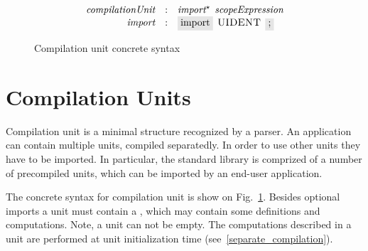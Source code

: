 \begin{figure}[t]
  \[
    \begin{array}{rcl}
      \defterm{compilationUnit}  & : & \nonterm{import}^\star\s\nonterm{scopeExpression}\\
      \defterm{import}           & : & \term{import}\s\token{UIDENT}\s\term{;}
    \end{array}
  \]
  \caption{Compilation unit concrete syntax}
  \label{compilation_unit}
\end{figure}

\section{Compilation Units}

Compilation unit is a minimal structure recognized by a parser. An application can contain multiple units, compiled separatedly.
In order to use other units they have to be imported. In particular, the standard library is comprized of a number of precompiled units,
which can be imported by an end-user application.

The concrete syntax for compilation unit is show on Fig.~\ref{compilation_unit}. Besides optional imports a unit must contain
a , which may contain some definitions and computations. Note, a unit can not be empty. The computations described in
a unit are performed at unit initialization time (see~\ref{separate_compilation}).

